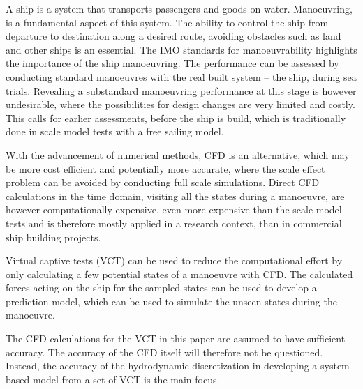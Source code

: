 A ship is a system that transports passengers and goods on water. Manoeuvring, is a fundamental aspect of this system. The ability to control the ship from departure to destination along a desired route, avoiding obstacles such as land and other ships is an essential. The IMO standards for manoeuvrability highlights the importance of the ship manoeuvring. The performance can be assessed by conducting standard manoeuvres with the real built system – the ship, during sea trials. Revealing a substandard manoeuvring performance at this stage is however undesirable, where the possibilities for design changes are very limited and costly. This calls for earlier assessments, before the ship is build, which is traditionally done in scale model tests with a free sailing model.

With the advancement of numerical methods, CFD is an alternative, which may be more cost efficient and potentially more accurate, where the scale effect problem can be avoided by conducting full scale simulations. Direct CFD calculations in the time domain, visiting all the states during a manoeuvre, are however computationally expensive, even more expensive than the scale model tests and is therefore mostly applied in a research context, than in commercial ship building projects.

Virtual captive tests (VCT) can be used to reduce the computational effort by only calculating a few potential states of a manoeuvre with CFD. The calculated forces acting on the ship for the sampled states can be used to develop a prediction model, which can be used to simulate the unseen states during the manoeuvre.  

The CFD calculations for the VCT in this paper are assumed to have sufficient accuracy. The accuracy of the CFD itself will therefore not be questioned. Instead, the accuracy of the hydrodynamic discretization in developing a system based model from a set of VCT is the main focus.  

\citep{abkowitz_ship_1964}